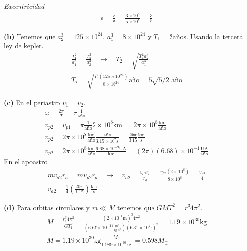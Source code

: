 \documentclass{article}
\begin{document}
\textit{Excentricidad }
\begin{gather*}
  \epsilon = \frac{c }{a } = \frac{3 \times 10^8 }{5 \times 10^8 } = \frac{3 }{5 }
\end{gather*}

\hfill 

\textbf{(b)} Tenemos que $ a_2^3 = 125\times 10 ^ {24 }  $, $ a_1^3 = 8 \times 10 ^ {24}  $ y $ T_1 = 2  $años. Usando la tercera ley de kepler. 
\begin{gather*}
  \frac{T_1^2 }{a_1^3 } = \frac{T_2^2 }{a_2^3 } \quad \rightarrow \quad T_2 = \sqrt{\frac{T_1^2 a_2^3 }{a_1^3 }}  \\
  T_2 = \sqrt{\frac{2^2 (125\times 10 ^ {24 })}{8 \times 10 ^ {24 }}} \text{año} = 5 \sqrt{5/2} \text{ año} 
\end{gather*}

\hfill 

\textbf{(c) } En el periastro $ v_1 = v_2  $. 
\begin{gather*}
  \omega = \frac{2\pi}{T} = \pi \frac{1}{\text{año}} \\
  v_{p2} = v_{p1} = \pi \frac{1}{\text{año}} 2 \times 10^8 \text{km } = 2\pi\times10^{8} \frac{\text{km}}{\text{año}} \\
  v _{p2} =2\pi \times10^{8 } \frac{\text{km}}{\text{año}} \frac{\text{año}}{3.15 \times10^{7 } s } = \frac{20\pi }{3.15 } \frac{\text{km}}{\text{s}} \\
  v _{p2}  =2\pi \times10^{8 } \frac{\text{km}}{\text{año}} \frac{6.68 \times10^{-9 }\text{UA}}{ \text{km} } = (2\pi)(6.68)\times10^{-1 } \frac{\text{UA}}{\text{año}} 
\end{gather*}
En el apoastro
\begin{gather*}
  m v _{a2 } r_a = m v _{p2 } r_p \quad \rightarrow \quad v _{a2 } = \frac{v _{p2 } r_p }{r_a } = \frac{v _{p2 } (2 \times10^{8 })}{8 \times10^{8}} = \frac{v _{p2 } }{4} \\
  v _{a2 } = \frac{1}{4}\left(\frac{20\pi}{3.15 }\right) \frac{\text{km}}{\text{s}}
\end{gather*}

\hfill 

\textbf{(d)} Para orbitas circulares y $ m\ll M $ tenemos que $ GM T^2 = r^3 4 \pi^2 $.
\begin{gather*}
  M = \frac{r_1^3 4\pi^2 }{G T_1^2} = \frac{(2 \times10^{11 }\text{m})^3 4\pi^2 }{(6.67 \times10^{-11 }\frac{m^3 }{\text{kg } \text{s}^2})(6.31 \times10^{7 } \text{s})^2} = 1.19 \times10^{30 }\text{kg} \\
  M = 1.19 \times10^{30 }\text{kg} \frac{M _{\odot} }{1.989 \times10^{30} \text{kg }} = 0.598 M _{\odot } 
\end{gather*}
\end{document}
